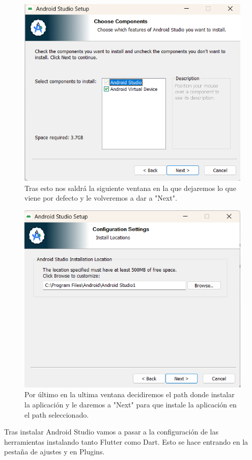\begin{figure}[H]
    \centering
    \includegraphics[width=0.8\linewidth]{AndroidStudio2.png}
    \caption{Tras esto nos saldrá la siguiente ventana en la que dejaremos lo que viene por defecto y le volveremos a dar a "Next".}
    \label{fig:enter-label}
\end{figure}


\begin{figure}[H]
    \centering
    \includegraphics[width=0.8\linewidth]{AndroidStudio3.png}
    \caption{Por último en la ultima ventana decidiremos el path donde instalar la aplicación y le daremos a "Next" para que instale la aplicación en el path seleccionado.}
    \label{fig:enter-label}
\end{figure}

Tras instalar Android Studio vamos a pasar a la configuración de las herramientas instalando tanto Flutter como Dart.
Esto se hace entrando en la pestaña de ajustes y en Plugins.

